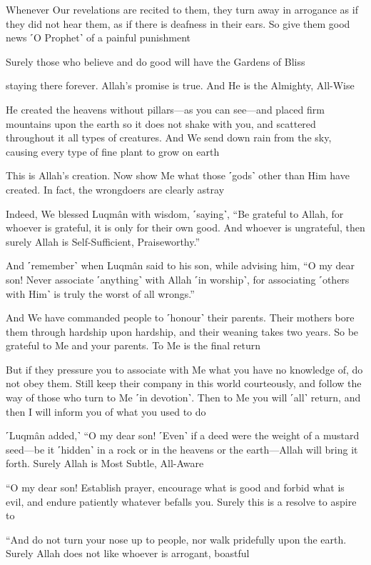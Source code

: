 Whenever Our revelations are recited to them, they turn away in arrogance as if they did not hear them, as if there is deafness in their ears. So give them good news ˹O Prophet˺ of a painful punishment

Surely those who believe and do good will have the Gardens of Bliss

staying there forever. Allah’s promise is true. And He is the Almighty, All-Wise

He created the heavens without pillars—as you can see—and placed firm mountains upon the earth so it does not shake with you, and scattered throughout it all types of creatures. And We send down rain from the sky, causing every type of fine plant to grow on earth

This is Allah’s creation. Now show Me what those ˹gods˺ other than Him have created. In fact, the wrongdoers are clearly astray

Indeed, We blessed Luqmân with wisdom, ˹saying˺, “Be grateful to Allah, for whoever is grateful, it is only for their own good. And whoever is ungrateful, then surely Allah is Self-Sufficient, Praiseworthy.”

And ˹remember˺ when Luqmân said to his son, while advising him, “O my dear son! Never associate ˹anything˺ with Allah ˹in worship˺, for associating ˹others with Him˺ is truly the worst of all wrongs.”

And We have commanded people to ˹honour˺ their parents. Their mothers bore them through hardship upon hardship, and their weaning takes two years. So be grateful to Me and your parents. To Me is the final return

But if they pressure you to associate with Me what you have no knowledge of, do not obey them. Still keep their company in this world courteously, and follow the way of those who turn to Me ˹in devotion˺. Then to Me you will ˹all˺ return, and then I will inform you of what you used to do

˹Luqmân added,˺ “O my dear son! ˹Even˺ if a deed were the weight of a mustard seed—be it ˹hidden˺ in a rock or in the heavens or the earth—Allah will bring it forth. Surely Allah is Most Subtle, All-Aware

“O my dear son! Establish prayer, encourage what is good and forbid what is evil, and endure patiently whatever befalls you. Surely this is a resolve to aspire to

“And do not turn your nose up to people, nor walk pridefully upon the earth. Surely Allah does not like whoever is arrogant, boastful

